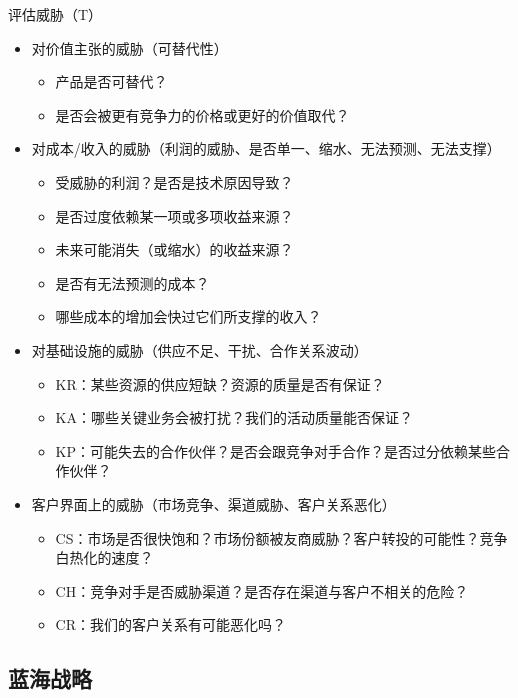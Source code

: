 评估威胁（T）
\begin{itemize}
    \item 对价值主张的威胁（可替代性）
    \begin{itemize}
        \item 产品是否可替代？
        \item 是否会被更有竞争力的价格或更好的价值取代？
    \end{itemize}
    \item 对成本/收入的威胁（利润的威胁、是否单一、缩水、无法预测、无法支撑）
    \begin{itemize}
        \item 受威胁的利润？是否是技术原因导致？
        \item 是否过度依赖某一项或多项收益来源？
        \item 未来可能消失（或缩水）的收益来源？
        \item 是否有无法预测的成本？
        \item 哪些成本的增加会快过它们所支撑的收入？
    \end{itemize}
    \item 对基础设施的威胁（供应不足、干扰、合作关系波动）
    \begin{itemize}
        \item KR：某些资源的供应短缺？资源的质量是否有保证？
        \item KA：哪些关键业务会被打扰？我们的活动质量能否保证？
        \item KP：可能失去的合作伙伴？是否会跟竞争对手合作？是否过分依赖某些合作伙伴？
    \end{itemize}
    \item 客户界面上的威胁（市场竞争、渠道威胁、客户关系恶化）
    \begin{itemize}
        \item CS：市场是否很快饱和？市场份额被友商威胁？客户转投的可能性？竞争白热化的速度？
        \item CH：竞争对手是否威胁渠道？是否存在渠道与客户不相关的危险？
        \item CR：我们的客户关系有可能恶化吗？
    \end{itemize}
\end{itemize}


\subsection{蓝海战略}

